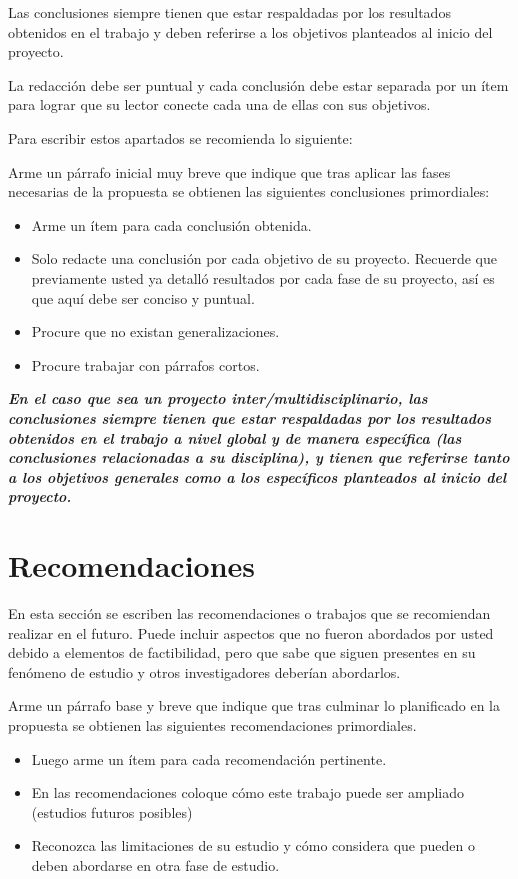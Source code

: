 \documentclass[12pt,oneside]{report}
\newenvironment{destacado}{\par\begin{list}{}{\leftmargin=1.27cm\rightmargin=0pt}\item\relax\bfseries\itshape}{\end{list}}
\begin{document}
Las conclusiones siempre tienen que estar respaldadas por los resultados obtenidos en el trabajo y deben referirse a los objetivos planteados al inicio del proyecto.

La redacción debe ser puntual y cada conclusión debe estar separada por un ítem para lograr que su lector conecte cada una de ellas con sus objetivos.

Para escribir estos apartados se recomienda lo siguiente:

Arme un párrafo inicial muy breve que indique que tras aplicar las fases necesarias de la propuesta se obtienen las siguientes conclusiones primordiales:
\begin{itemize}[leftmargin=2cm]
  \item Arme un ítem para cada conclusión obtenida.
  \item Solo redacte una conclusión por cada objetivo de su proyecto. Recuerde que previamente usted ya detalló resultados por cada fase de su proyecto, así es que aquí debe ser conciso y puntual.
  \item Procure que no existan generalizaciones.
  \item Procure trabajar con párrafos cortos.
\end{itemize}

\begin{destacado}
En el caso que sea un proyecto inter/multidisciplinario, las conclusiones siempre tienen que estar respaldadas por los resultados obtenidos en el trabajo a nivel global y de manera específica (las conclusiones relacionadas a su disciplina), y tienen que referirse tanto a los objetivos generales como a los específicos planteados al inicio del proyecto.
\end{destacado}

\section{Recomendaciones}

En esta sección se escriben las recomendaciones o trabajos que se recomiendan realizar en el futuro. Puede incluir aspectos que no fueron abordados por usted debido a elementos de factibilidad, pero que sabe que siguen presentes en su fenómeno de estudio y otros investigadores deberían abordarlos.

Arme un párrafo base y breve que indique que tras culminar lo planificado en la propuesta se obtienen las siguientes recomendaciones primordiales.
\begin{itemize}[leftmargin=2cm]
  \item Luego arme un ítem para cada recomendación pertinente.
  \item En las recomendaciones coloque cómo este trabajo puede ser ampliado (estudios futuros posibles)
  \item Reconozca las limitaciones de su estudio y cómo considera que pueden o deben abordarse en otra fase de estudio.
\end{itemize}
\end{document}
